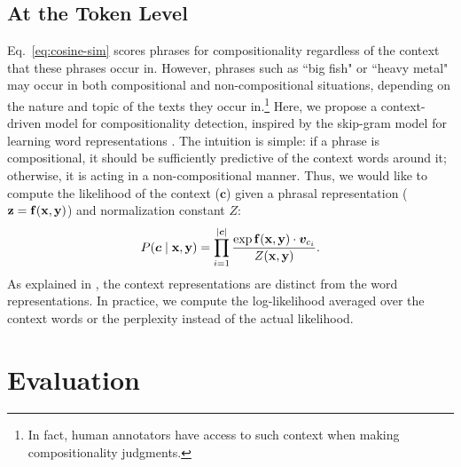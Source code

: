 \documentclass[11pt]{article}
\newcommand{\bX}{{\bf x}}
\newcommand{\bY}{{\bf y}}
\newcommand{\bZ}{{\bf z}}
\newcommand{\bF}{{\bf f}}
\begin{document}
\subsection{At the Token Level}
\label{sec:context}

Eq.~\ref{eq:cosine-sim} scores phrases for compositionality regardless of the context that these phrases occur in. 
However, phrases such as ``big fish" or ``heavy metal" may occur in both compositional and non-compositional situations, depending on the nature and topic of the texts they occur in.\footnote{In fact, human annotators have access to such context when making compositionality judgments.}
Here, we propose a context-driven model for compositionality detection, inspired by the skip-gram model for learning word representations \cite{Mikolov2013b}. 
The intuition is simple: if a phrase is compositional, it should be sufficiently predictive of the context words around it; otherwise, it is acting in a non-compositional manner. 
Thus, we would like to compute the likelihood of the context ($\boldsymbol{c}$) given a phrasal representation ($\bZ = \bF(\bX, \bY)$) and normalization constant $Z$:
\begin{align}
	P(\boldsymbol{c} \mid \bX,\bY) = \prod_{i=1}^{|\boldsymbol{c}|} \frac{\exp \bF(\bX,\bY) \cdot \boldsymbol{v}_{c_i}}{Z(\bX,\bY)}.
	\label{eq:likelihood}
\end{align}
As explained in , the context representations are distinct from the word representations.
In practice, we compute the log-likelihood averaged over the context words or the perplexity instead of the actual likelihood. 

\section{Evaluation}
\label{sec:experiments}
\end{document}

